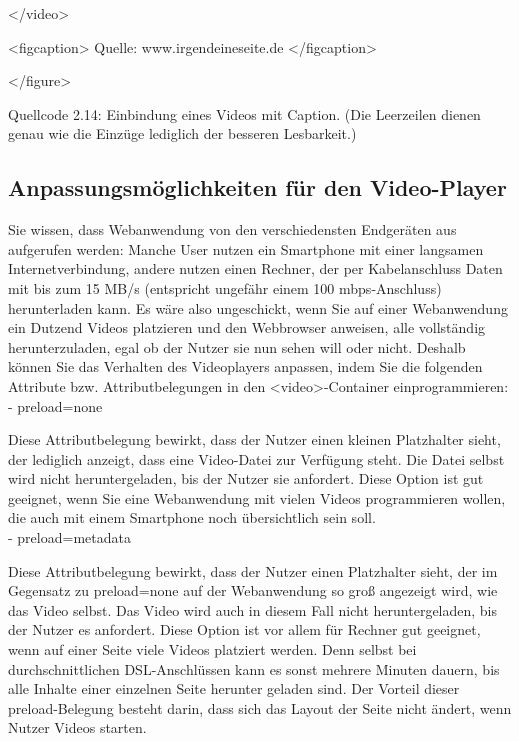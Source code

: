 </video>

<figcaption>
Quelle: www.irgendeineseite.de
</figcaption>

</figure>

Quellcode 2.14: Einbindung eines Videos mit Caption. (Die Leerzeilen dienen genau wie die Einzüge lediglich der besseren Lesbarkeit.)

\subsection{Anpassungsmöglichkeiten für den Video-Player}

Sie wissen, dass Webanwendung von den verschiedensten Endgeräten aus aufgerufen werden: Manche User nutzen ein Smartphone mit einer langsamen Internetverbindung, andere nutzen einen Rechner, der per Kabelanschluss Daten mit bis zum 15 MB/s (entspricht ungefähr einem 100 mbps-Anschluss) herunterladen kann. Es wäre also ungeschickt, wenn Sie auf einer Webanwendung ein Dutzend Videos platzieren und den Webbrowser anweisen, alle vollständig herunterzuladen, egal ob der Nutzer sie nun sehen will oder nicht. Deshalb können Sie das Verhalten des Videoplayers anpassen, indem Sie die folgenden Attribute bzw. Attributbelegungen in den <video>-Container einprogrammieren:\\

-	preload=none

Diese Attributbelegung bewirkt, dass der Nutzer einen kleinen Platzhalter sieht, der lediglich anzeigt, dass eine Video-Datei zur Verfügung steht. Die Datei selbst wird nicht heruntergeladen, bis der Nutzer sie anfordert. Diese Option ist gut geeignet, wenn Sie eine Webanwendung mit vielen Videos programmieren wollen, die auch mit einem Smartphone noch übersichtlich sein soll.\\

-	preload=metadata

Diese Attributbelegung bewirkt, dass der Nutzer einen Platzhalter sieht, der im Gegensatz zu preload=none auf der Webanwendung so groß angezeigt wird, wie das Video selbst. Das Video wird auch in diesem Fall nicht heruntergeladen, bis der Nutzer es anfordert. Diese Option ist vor allem für Rechner gut geeignet, wenn auf einer Seite viele Videos platziert werden. Denn selbst bei durchschnittlichen DSL-Anschlüssen kann es sonst mehrere Minuten dauern, bis alle Inhalte einer einzelnen Seite herunter geladen sind. Der Vorteil dieser preload-Belegung besteht darin, dass sich das Layout der Seite nicht ändert, wenn Nutzer Videos starten.\\

